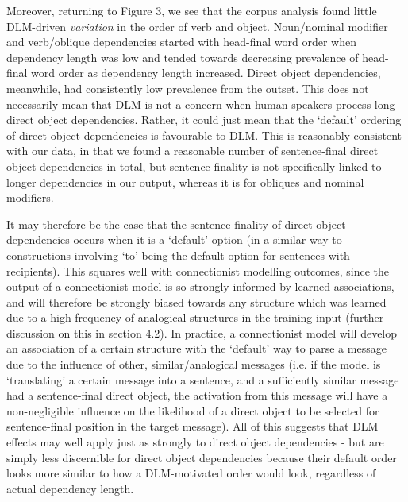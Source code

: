 \documentclass{article}
\begin{document}
Moreover, returning to Figure 3, we see that the corpus analysis found little DLM-driven \textit{variation} in the order of verb and object. Noun/nominal modifier and verb/oblique dependencies started with head-final word order when dependency length was low and tended towards decreasing prevalence of head-final word order as dependency length increased. Direct object dependencies, meanwhile, had consistently low prevalence from the outset. This does not necessarily mean that DLM is not a concern when human speakers process long direct object dependencies. Rather, it could just mean that the `default' ordering of direct object dependencies is favourable to DLM. This is reasonably consistent with our data, in that we found a reasonable number of sentence-final direct object dependencies in total, but sentence-finality is not specifically linked to longer dependencies in our output, whereas it is for obliques and nominal modifiers. 

It may therefore be the case that the sentence-finality of direct object dependencies occurs when it is a `default' option (in a similar way to constructions involving `to' being the default option for sentences with recipients). This squares well with connectionist modelling outcomes, since the output of a connectionist model is so strongly informed by learned associations, and will therefore be strongly biased towards any structure which was learned due to a high frequency of analogical structures in the training input (further discussion on this in section 4.2). In practice, a connectionist model will develop an association of a certain structure with the `default' way to parse a message due to the influence of other, similar/analogical messages (i.e. if the model is `translating' a certain message into a sentence, and a sufficiently similar message had a sentence-final direct object, the activation from this message will have a non-negligible influence on the likelihood of a direct object to be selected for sentence-final position in the target message). All of this suggests that DLM effects may well apply just as strongly to direct object dependencies - but are simply less discernible for direct object dependencies because their default order looks more similar to how a DLM-motivated order would look, regardless of actual dependency length.
\end{document}
